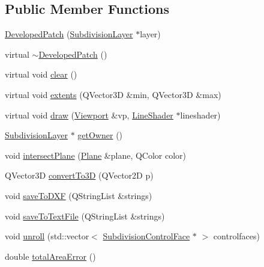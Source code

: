 \subsection*{Public Member Functions}
\begin{DoxyCompactItemize}
\item 
\hyperlink{classShipCAD_1_1DevelopedPatch_ac204705b008b75aa3633a4025d14e518}{Developed\+Patch} (\hyperlink{classShipCAD_1_1SubdivisionLayer}{Subdivision\+Layer} $\ast$layer)
\item 
virtual \hyperlink{classShipCAD_1_1DevelopedPatch_a7e47417b03f9d91f891edb34441eb045}{$\sim$\+Developed\+Patch} ()
\item 
virtual void \hyperlink{classShipCAD_1_1DevelopedPatch_af3c4ba4cad20580cc8d5a4591b0bffd0}{clear} ()
\item 
virtual void \hyperlink{classShipCAD_1_1DevelopedPatch_a6d8a53701a952c0a6777e0b0c2ca6127}{extents} (Q\+Vector3D \&min, Q\+Vector3D \&max)
\item 
virtual void \hyperlink{classShipCAD_1_1DevelopedPatch_a7ba24420b1e8a1fb98acac3d38f8e37e}{draw} (\hyperlink{classShipCAD_1_1Viewport}{Viewport} \&vp, \hyperlink{classShipCAD_1_1LineShader}{Line\+Shader} $\ast$lineshader)
\item 
\hyperlink{classShipCAD_1_1SubdivisionLayer}{Subdivision\+Layer} $\ast$ \hyperlink{classShipCAD_1_1DevelopedPatch_a53dbb5c8582ded9fce56d81b3e79116d}{get\+Owner} ()
\item 
void \hyperlink{classShipCAD_1_1DevelopedPatch_a71eaddef96ee0edcefb7c15f07c65f7a}{intersect\+Plane} (\hyperlink{classShipCAD_1_1Plane}{Plane} \&plane, Q\+Color color)
\item 
Q\+Vector3D \hyperlink{classShipCAD_1_1DevelopedPatch_acd5b00b39301b249e3c019674dd67186}{convert\+To3D} (Q\+Vector2D p)
\item 
void \hyperlink{classShipCAD_1_1DevelopedPatch_a9ecc3812de9fd0999336c99a71774bbd}{save\+To\+D\+XF} (Q\+String\+List \&strings)
\item 
void \hyperlink{classShipCAD_1_1DevelopedPatch_a0528f08293c1ac8e53e3954c8c9e8585}{save\+To\+Text\+File} (Q\+String\+List \&strings)
\item 
void \hyperlink{classShipCAD_1_1DevelopedPatch_a55470422ecac9d544c811eddc8c3d1c1}{unroll} (std\+::vector$<$ \hyperlink{classShipCAD_1_1SubdivisionControlFace}{Subdivision\+Control\+Face} $\ast$ $>$ controlfaces)
\item 
double \hyperlink{classShipCAD_1_1DevelopedPatch_a4ddcf2a3bb1886d6210a89d5b524a2eb}{total\+Area\+Error} ()

\end{DoxyCompactItemize}
